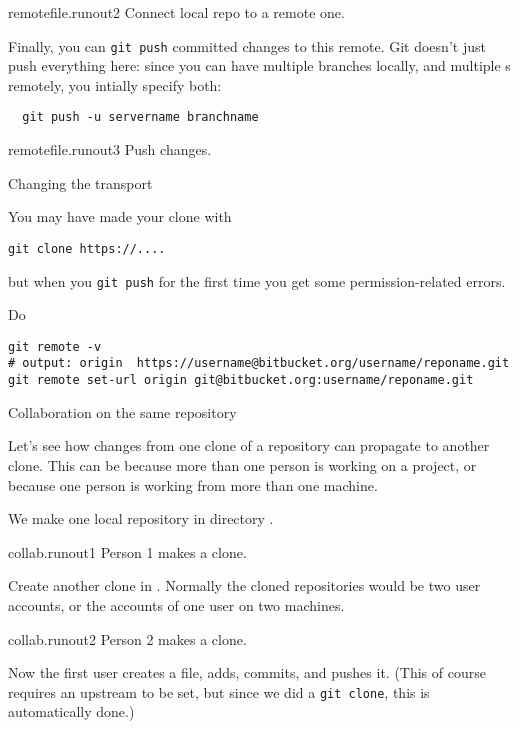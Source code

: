 \begin{gitstep}{remotefile.runout2}
  Connect local repo to a remote one.
\end{gitstep}

Finally, you can \lstinline{git push} committed changes to this remote.
Git doesn't just push everything here: since you can have multiple branches locally,
and multiple s remotely, you intially specify both:
\begin{lstlisting}
  git push -u servername branchname
\end{lstlisting}

\begin{gitstep}{remotefile.runout3}
  Push changes.
\end{gitstep}

 {Changing the transport}

You may have made your clone with
\begin{verbatim}
git clone https://....
\end{verbatim}
but when you \lstinline{git push} for the first time
you get some permission-related errors.

Do
\begin{verbatim}
git remote -v
# output: origin  https://username@bitbucket.org/username/reponame.git
git remote set-url origin git@bitbucket.org:username/reponame.git
\end{verbatim}

 {Collaboration on the same repository}

Let's see how changes from one clone of a repository
can propagate to another clone.
This can be because more than one person is working on a project,
or because one person is working from more than one machine.

We make one local repository in directory .

\begin{gitstep}{collab.runout1}
  Person 1 makes a clone.
\end{gitstep}

Create another clone in .
Normally the cloned repositories would be two user accounts,
or the accounts of one user on two machines.

\begin{gitstep}{collab.runout2}
  Person 2 makes a clone.
\end{gitstep}

Now the first user creates a file, adds, commits, and pushes it.
(This of course requires an upstream to be set,
but since we did a \lstinline{git clone},
this is automatically done.)

